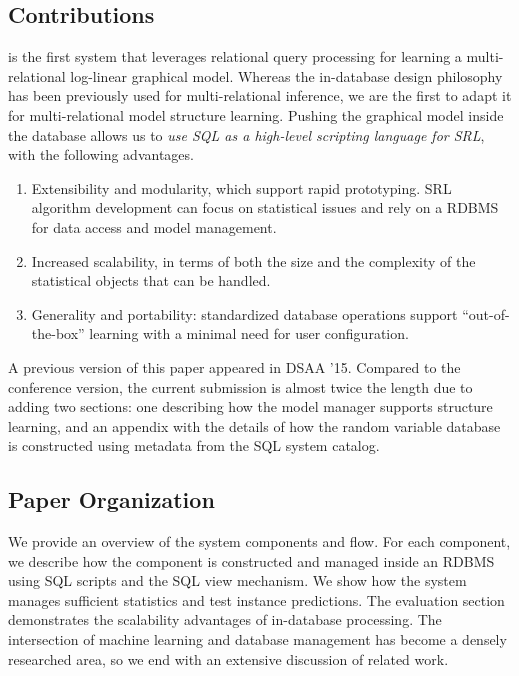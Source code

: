 \subsection{Contributions}
\FB  is the first system that leverages relational query processing for learning a multi-relational log-linear graphical model. Whereas the in-database design philosophy has been previously used for multi-relational inference, we are the first to adapt it for multi-relational model structure learning. Pushing the graphical model inside the database 
allows us to {\em use SQL as a high-level scripting language for SRL}, with the following advantages.

\begin{enumerate}
\item Extensibility and modularity, which support rapid prototyping. SRL algorithm development can focus on statistical issues and rely on a RDBMS for data access and model management.
\item Increased scalability, in terms of both the size and the complexity of the statistical objects that can be handled.
\item Generality and portability: standardized database operations support ``out-of-the-box'' learning with a minimal need for user configuration.
\end{enumerate}

A previous version of this paper appeared in DSAA '15. Compared to the conference version, the current submission is almost twice the length due to adding two sections: one describing how the model manager supports structure learning, and an appendix with the details of how the random variable database is constructed using metadata from the SQL system catalog.

\subsection{Paper Organization}
We provide an overview of the system components and flow. For each component, we describe how the component is constructed and managed inside an RDBMS using SQL scripts and the SQL view mechanism. We show how the system manages sufficient statistics and test instance predictions. The evaluation section demonstrates the scalability advantages of in-database processing. The intersection of machine learning and database management has become a densely researched area, so we end with an extensive discussion of related work. 





